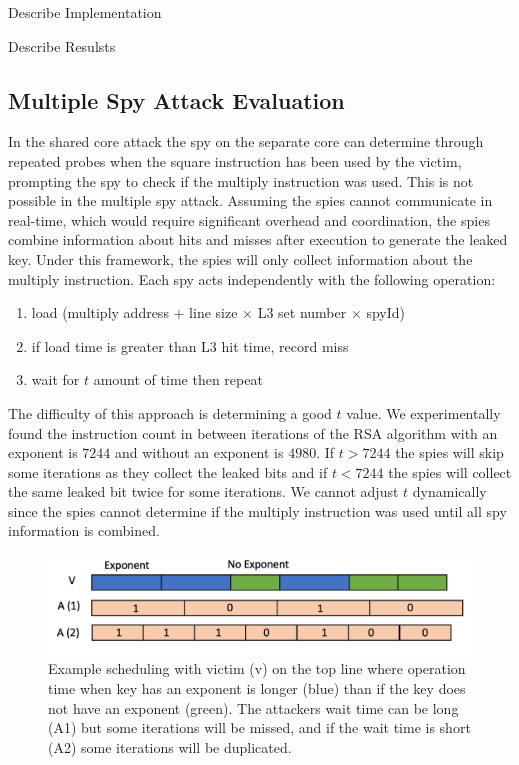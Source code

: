 \documentclass[12pt]{article}
\begin{document}
Describe Implementation 

Describe Resulsts

\subsection{Multiple Spy Attack Evaluation}

In the shared core attack the spy on the separate core can determine through repeated probes when the square instruction has been used by the victim, prompting the spy to check if the multiply instruction was used.
This is not possible in the multiple spy attack.
Assuming the spies cannot communicate in real-time, which would require significant overhead and coordination, the spies combine information about hits and misses after execution to generate the leaked key.
Under this framework, the spies will only collect information about the multiply instruction.
Each spy acts independently with the following operation: 
\begin{enumerate} 
\item load (multiply address + line size $\times$ L3 set number  $\times$ spyId)
\item if load time is greater than L3 hit time, record miss
\item wait for $t$ amount of time then repeat
\end{enumerate}

The difficulty of this approach is determining a good $t$ value. 
We experimentally found the instruction count in between iterations of the RSA algorithm with an exponent is $7244$ and without an exponent is $4980$.
If $t > 7244$ the spies will skip some iterations as they collect the leaked bits and if $t <7244$ the spies will collect the same leaked bit twice for some iterations.
We cannot adjust $t$ dynamically since the spies cannot determine if the multiply instruction was used until all spy information is combined. 

\begin{figure}[h]
\centering
\includegraphics[scale=0.5]{../presentation/multi-order.png}
\caption{Example scheduling with victim (v) on the top line where operation time when key has an exponent is longer (blue) than if the key does not have an exponent (green). The attackers wait time can be long (A1) but some iterations will be missed, and if the wait time is short (A2) some iterations will be duplicated.}
\label{fig:mo}
\end{figure}
\end{document}
